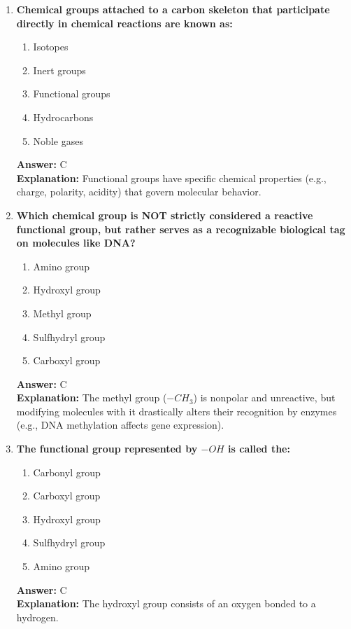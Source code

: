 \documentclass[11pt, a4paper]{article}
\begin{document}
\begin{enumerate}

\item \textbf{Chemical groups attached to a carbon skeleton that participate directly in chemical reactions are known as:}
\begin{enumerate}[label=\Alph*.]
    \item Isotopes
    \item Inert groups
    \item Functional groups
    \item Hydrocarbons
    \item Noble gases
\end{enumerate}
\textbf{Answer:} C \\
\textbf{Explanation:} Functional groups have specific chemical properties (e.g., charge, polarity, acidity) that govern molecular behavior.

\item \textbf{Which chemical group is NOT strictly considered a reactive functional group, but rather serves as a recognizable biological tag on molecules like DNA?}
\begin{enumerate}[label=\Alph*.]
    \item Amino group
    \item Hydroxyl group
    \item Methyl group
    \item Sulfhydryl group
    \item Carboxyl group
\end{enumerate}
\textbf{Answer:} C \\
\textbf{Explanation:} The methyl group ($-CH_3$) is nonpolar and unreactive, but modifying molecules with it drastically alters their recognition by enzymes (e.g., DNA methylation affects gene expression).

\item \textbf{The functional group represented by $-OH$ is called the:}
\begin{enumerate}[label=\Alph*.]
    \item Carbonyl group
    \item Carboxyl group
    \item Hydroxyl group
    \item Sulfhydryl group
    \item Amino group
\end{enumerate}
\textbf{Answer:} C \\
\textbf{Explanation:} The hydroxyl group consists of an oxygen bonded to a hydrogen.


\end{enumerate}
\end{document}
